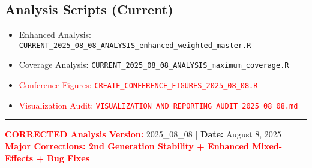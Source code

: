 \subsection{Analysis Scripts (Current)}
\begin{itemize}
    \item Enhanced Analysis: \texttt{CURRENT\_2025\_08\_08\_ANALYSIS\_enhanced\_weighted\_master.R}
    \item Coverage Analysis: \texttt{CURRENT\_2025\_08\_08\_ANALYSIS\_maximum\_coverage.R}
    \item \textcolor{red}{Conference Figures: \texttt{CREATE\_CONFERENCE\_FIGURES\_2025\_08\_08.R}}
    \item \textcolor{red}{Visualization Audit: \texttt{VISUALIZATION\_AND\_REPORTING\_AUDIT\_2025\_08\_08.md}}
\end{itemize}

\vspace{1em}
\noindent\rule{\textwidth}{0.2pt}

\begin{center}
\textbf{\textcolor{red}{CORRECTED Analysis Version:}} 2025\_08\_08 | \textbf{Date:} August 8, 2025\\
\textcolor{red}{\textbf{Major Corrections: 2nd Generation Stability + Enhanced Mixed-Effects + Bug Fixes}}
\end{center}
